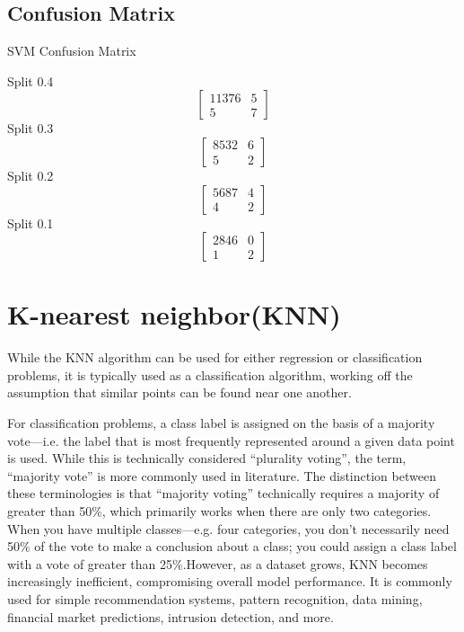 \documentclass[12pt,a4paper]{report}
\begin{document}
\section{Confusion Matrix}
SVM Confusion Matrix\par
\vspace{0.5cm}
Split 0.4
\[
\begin{bmatrix}
  11376 & 5\\
  5 & 7
\end{bmatrix}
\]
Split 0.3
\[
\begin{bmatrix}
  8532 & 6\\
  5 & 2
\end{bmatrix}
\]
Split 0.2
\[
\begin{bmatrix}
  5687 & 4\\
  4 & 2
\end{bmatrix}
\]
Split 0.1
\[
\begin{bmatrix}
  2846 & 0\\
  1 & 2
\end{bmatrix}
\]



\chapter{K-nearest neighbor(KNN)}

While the KNN algorithm can be used for either regression or classification problems, it is typically used as a classification algorithm, working off the assumption that similar points can be found near one another.


For classification problems, a class label is assigned on the basis of a majority vote—i.e. the label that is most frequently represented around a given data point is used. While this is technically considered “plurality voting”, the term, “majority vote” is more commonly used in literature. The distinction between these terminologies is that “majority voting” technically requires a majority of greater than 50\%, which primarily works when there are only two categories. When you have multiple classes—e.g. four categories, you don’t necessarily need 50\% of the vote to make a conclusion about a class; you could assign a class label with a vote of greater than 25\%.However, as a dataset grows, KNN becomes increasingly inefficient, compromising overall model performance. It is commonly used for simple recommendation systems, pattern recognition, data mining, financial market predictions, intrusion detection, and more.
\end{document}
